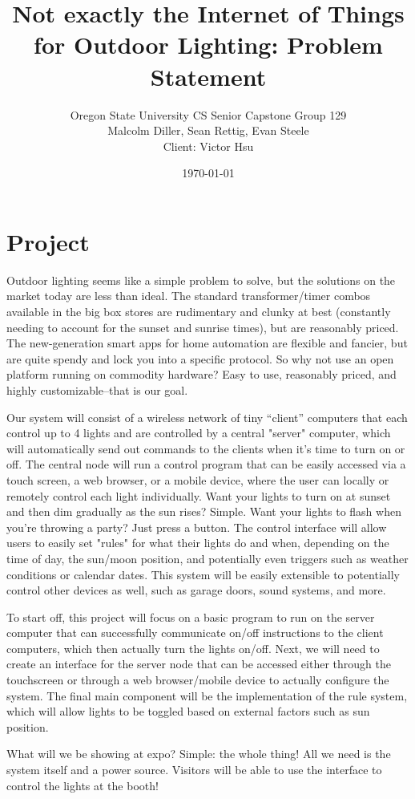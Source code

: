 \documentclass{article}
\title{Not exactly the Internet of Things for Outdoor Lighting: Problem Statement}
\author{Oregon State University CS Senior Capstone Group 129\\Malcolm Diller, Sean Rettig, Evan Steele\\Client: Victor Hsu}
\date{\today}
\begin{document}
\maketitle

\section{Project}

Outdoor lighting seems like a simple problem to solve, but the solutions on the
market today are less than ideal.  The standard transformer/timer combos
available in the big box stores are rudimentary and clunky at best (constantly
needing to account for the sunset and sunrise times), but are reasonably
priced. The new-generation smart apps for home automation are flexible and
fancier, but are quite spendy and lock you into a specific protocol.  So why
not use an open platform running on commodity hardware?  Easy to use,
reasonably priced, and highly customizable--that is our goal.

Our system will consist of a wireless network of tiny “client” computers that
each control up to 4 lights and are controlled by a central "server" computer,
which will automatically send out commands to the clients when it's time to
turn on or off.  The central node will run a control program that can be easily
accessed via a touch screen, a web browser, or a mobile device, where the user
can locally or remotely control each light individually.  Want your lights to
turn on at sunset and then dim gradually as the sun rises?  Simple.  Want your
lights to flash when you're throwing a party?  Just press a button.  The
control interface will allow users to easily set "rules" for what their lights
do and when, depending on the time of day, the sun/moon position, and
potentially even triggers such as weather conditions or calendar dates.  This
system will be easily extensible to potentially control other devices as well,
such as garage doors, sound systems, and more.

To start off, this project will focus on a basic program to run on the server
computer that can successfully communicate on/off instructions to the client
computers, which then actually turn the lights on/off.  Next, we will need to
create an interface for the server node that can be accessed either through the
touchscreen or through a web browser/mobile device to actually configure the
system.  The final main component will be the implementation of the rule
system, which will allow lights to be toggled based on external factors such as
sun position.

What will we be showing at expo?  Simple: the whole thing!  All we need is the
system itself and a power source.  Visitors will be able to use the interface
to control the lights at the booth!
\end{document}
